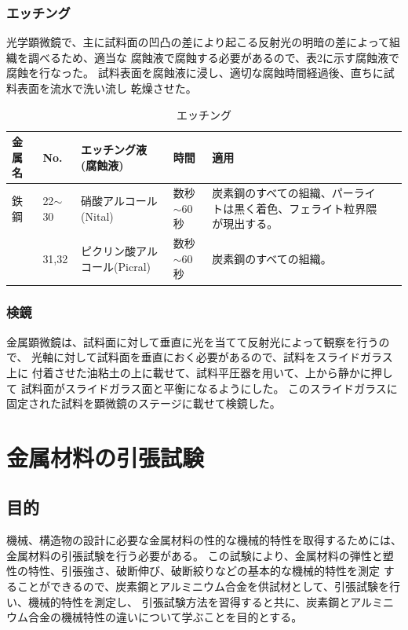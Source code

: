 \documentclass[10pt,a4j]{jsarticle}
\begin{document}
    \subsubsection{エッチング}
    光学顕微鏡で、主に試料面の凹凸の差により起こる反射光の明暗の差によって組織を調べるため、適当な
    腐蝕液で腐蝕する必要があるので、表2に示す腐蝕液で腐蝕を行なった。 
    試料表面を腐蝕液に浸し、適切な腐蝕時間経過後、直ちに試料表面を流水で洗い流し
    乾燥させた。
    \begin{table}[H]
      \centering
      \caption{エッチング}
      \label{my-label}
      \footnotesize
      \begin{tabular}{llllll}
        金属名 & No.        & エッチング液(腐蝕液)        & 時間 & 適用          \\ \hline
        鉄鋼  & 22$\sim$30 & 硝酸アルコール(Nital)      & 数秒$\sim$60秒 & 炭素鋼のすべての組織、パーライトは黒く着色、フェライト粒界隈が現出する。 \\
            & 31,32      & ピクリン酸アルコール(Picral) & 数秒$\sim$60秒 & 炭素鋼のすべての組織。
      \end{tabular}
    \end{table}
    \subsubsection{検鏡}
    金属顕微鏡は、試料面に対して垂直に光を当てて反射光によって観察を行うので、
    光軸に対して試料面を垂直におく必要があるので、試料をスライドガラス上に
    付着させた油粘土の上に載せて、試料平圧器を用いて、上から静かに押して
    試料面がスライドガラス面と平衡になるようにした。
    このスライドガラスに固定された試料を顕微鏡のステージに載せて検鏡した。

  
\section{金属材料の引張試験}
  \subsection{目的}
  機械、構造物の設計に必要な金属材料の性的な機械的特性を取得するためには、金属材料の引張試験を行う必要がある。
  この試験により、金属材料の弾性と塑性の特性、引張強さ、破断伸び、破断絞りなどの基本的な機械的特性を測定
  することができるので、炭素鋼とアルミニウム合金を供試材として、引張試験を行い、機械的特性を測定し、
  引張試験方法を習得すると共に、炭素鋼とアルミニウム合金の機械特性の違いについて学ぶことを目的とする。
\end{document}
